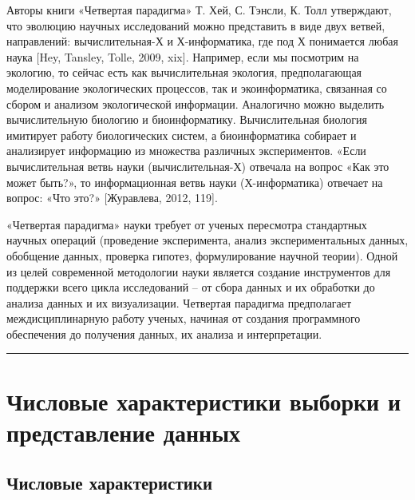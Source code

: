 \documentclass[11pt,a4paper]{article}
\begin{document}
Авторы книги «Четвертая парадигма» Т. Хей, С. Тэнсли, К. Толл
утверждают, что эволюцию научных исследований можно представить в виде
двух ветвей, направлений: вычислительная-Х и Х-информатика, где под Х
понимается любая наука {[}Hey, Tansley, Tolle, 2009, xix{]}. Например,
если мы посмотрим на экологию, то сейчас есть как вычислительная
экология, предполагающая моделирование экологических процессов, так и
экоинформатика, связанная со сбором и анализом экологической информации.
Аналогично можно выделить вычислительную биологию и биоинформатику.
Вычислительная биология имитирует работу биологических систем, а
биоинформатика собирает и анализирует информацию из множества различных
экспериментов. «Если вычислительная ветвь науки (вычислительная-Х)
отвечала на вопрос «Как это может быть?», то информационная ветвь науки
(Х-информатика) отвечает на вопрос: «Что это?» {[}Журавлева, 2012,
119{]}.

«Четвертая парадигма» науки требует от ученых пересмотра стандартных
научных операций (проведение эксперимента, анализ экспериментальных
данных, обобщение данных, проверка гипотез, формулирование научной
теории). Одной из целей современной методологии науки является создание
инструментов для поддержки всего цикла исследований -- от сбора данных и
их обработки до анализа данных и их визуализации. Четвертая парадигма
предполагает междисциплинарную работу ученых, начиная от создания
программного обеспечения до получения данных, их анализа и
интерпретации.

    \begin{center}\rule{0.5\linewidth}{0.5pt}\end{center}

    \hypertarget{ux447ux438ux441ux43bux43eux432ux44bux435-ux445ux430ux440ux430ux43aux442ux435ux440ux438ux441ux442ux438ux43aux438-ux432ux44bux431ux43eux440ux43aux438-ux438-ux43fux440ux435ux434ux441ux442ux430ux432ux43bux435ux43dux438ux435-ux434ux430ux43dux43dux44bux445}{%
\section{Числовые характеристики выборки и представление
данных}\label{ux447ux438ux441ux43bux43eux432ux44bux435-ux445ux430ux440ux430ux43aux442ux435ux440ux438ux441ux442ux438ux43aux438-ux432ux44bux431ux43eux440ux43aux438-ux438-ux43fux440ux435ux434ux441ux442ux430ux432ux43bux435ux43dux438ux435-ux434ux430ux43dux43dux44bux445}}

\hypertarget{ux447ux438ux441ux43bux43eux432ux44bux435-ux445ux430ux440ux430ux43aux442ux435ux440ux438ux441ux442ux438ux43aux438}{%
\subsection{Числовые
характеристики}\label{ux447ux438ux441ux43bux43eux432ux44bux435-ux445ux430ux440ux430ux43aux442ux435ux440ux438ux441ux442ux438ux43aux438}}
\end{document}
